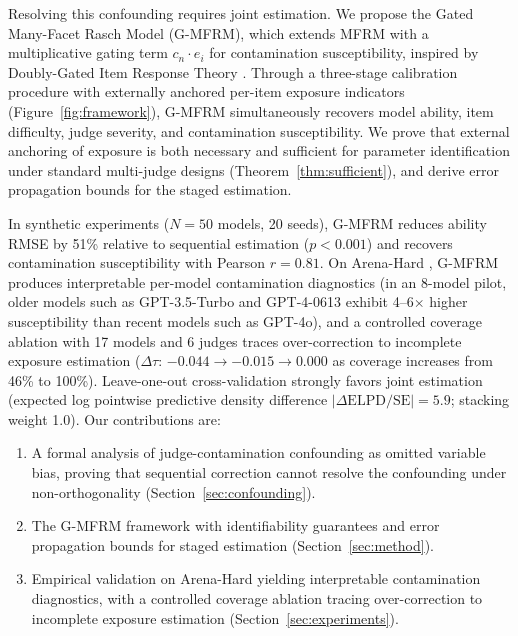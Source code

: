 Resolving this confounding requires joint estimation. We propose the Gated Many-Facet Rasch Model (G-MFRM), which extends MFRM with a multiplicative gating term $c_n \cdot e_i$ for contamination susceptibility, inspired by Doubly-Gated Item Response Theory \citep{shu2013dgirt}. Through a three-stage calibration procedure with externally anchored per-item exposure indicators (Figure~\ref{fig:framework}), G-MFRM simultaneously recovers model ability, item difficulty, judge severity, and contamination susceptibility. We prove that external anchoring of exposure is both necessary and sufficient for parameter identification under standard multi-judge designs (Theorem~\ref{thm:sufficient}), and derive error propagation bounds for the staged estimation.

In synthetic experiments ($N = 50$ models, 20 seeds), G-MFRM reduces ability RMSE by 51\% relative to sequential estimation ($p < 0.001$) and recovers contamination susceptibility with Pearson $r = 0.81$. On Arena-Hard \citep{li2024arenahard}, G-MFRM produces interpretable per-model contamination diagnostics (in an 8-model pilot, older models such as GPT-3.5-Turbo and GPT-4-0613 exhibit 4--6$\times$ higher susceptibility than recent models such as GPT-4o), and a controlled coverage ablation with 17 models and 6 judges traces over-correction to incomplete exposure estimation ($\Delta\tau$: $-0.044 \to -0.015 \to 0.000$ as coverage increases from 46\% to 100\%). Leave-one-out cross-validation strongly favors joint estimation (expected log pointwise predictive density difference $|\Delta\mathrm{ELPD}/\mathrm{SE}| = 5.9$; stacking weight 1.0). Our contributions are:
\begin{enumerate}
    \item A formal analysis of judge-contamination confounding as omitted variable bias, proving that sequential correction cannot resolve the confounding under non-orthogonality (Section~\ref{sec:confounding}).
    \item The G-MFRM framework with identifiability guarantees and error propagation bounds for staged estimation (Section~\ref{sec:method}).
    \item Empirical validation on Arena-Hard yielding interpretable contamination diagnostics, with a controlled coverage ablation tracing over-correction to incomplete exposure estimation (Section~\ref{sec:experiments}).
\end{enumerate}
